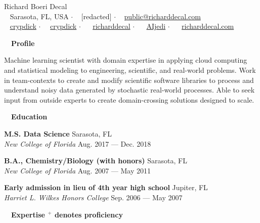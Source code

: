\documentclass[a4paper,12pt]{article}
\newcommand{\resheading}[1]{{\hspace{-9pt} \colorbox{mygrey}{\begin{minipage}{\textwidth}{\textmd{~~\large \textbf{#1} \vphantom{p\^{E}}}}\end{minipage}}\vspace{6pt}} }
\newcommand{\ressubheading}[4]{{\begin{minipage}{\textwidth}
                                    \textbf{#1} \hfill #2 \\
                                    \textit{#3} \hfill #4 \\
\end{minipage}}}
\begin{document}
    \begin{center}
    {\Huge Richard Boeri Decal}
        \\
        {\small \faMapMarker~ Sarasota, FL, USA $\cdot$ \faPhone~ [redacted] $\cdot$ \faEnvelope~ \href{mailto:public@richarddecal.com}{public@richarddecal.com}  \\ \faGithubAlt~ \href{https://github.com/crypdick}{crypdick} $\cdot$~\faStackOverflow~  \href{https://stackoverflow.com/users/4212158/crypdick}{crypdick} $\cdot$ ~\faLinkedin~ \href{https://www.linkedin.com/in/richarddecal/}{richarddecal}  $\cdot$ ~\faTwitter~ \href{https://twitter.com/AIjedi}{AIjedi}  $\cdot$ ~\faHome~  \href{http://www.richarddecal.com}{richarddecal.com}}
    \end{center}

    \resheading{Profile}

    Machine learning scientist with domain expertise in applying cloud computing and statistical modeling to engineering, scientific, and real-world problems.
    Work in team-contexts to create and modify scientific software libraries to process and understand noisy data generated by stochastic real-world processes.
    Able to seek input from outside experts to create domain-crossing solutions designed to scale. \\

    \resheading{Education}

    \ressubheading{M.S. Data Science}{Sarasota, FL}{New College of Florida}{Aug. 2017 --- Dec. 2018}



    \ressubheading{B.A., Chemistry/Biology (with honors)}{Sarasota, FL}{New College of Florida}{Aug. 2007 --- May 2011}

    \ressubheading{Early admission in lieu of 4th year high school}{Jupiter, FL}{Harriet L. Wilkes Honors College}{Sep. 2006 --- May 2007}


    \resheading{Expertise \hfill {\small$^+$ denotes proficiency}}
\end{document}
